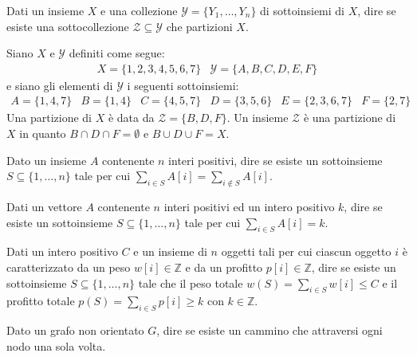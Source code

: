 \begin{problem}
    Dati un insieme $X$ e una collezione $\mathcal{Y}=\{Y_1,\dots,Y_n\}$ di
    sottoinsiemi di $X$, dire se esiste una sottocollezione $\mathcal{Z}\subseteq
    \mathcal{Y}$ che partizioni $X$.
\end{problem}
\begin{eg}
    Siano $X$ e $\mathcal{Y}$ definiti come segue:
    \[\begin{array}{lr}
        X=\{1,2,3,4,5,6,7\} & \mathcal{Y}=\{A,B,C,D,E,F\}
    \end{array}\]
    e siano gli elementi di $\mathcal{Y}$ i seguenti sottoinsiemi:
    \[\begin{array}{llllll}
        A=\{1,4,7\} & B=\{1,4\} & C=\{4,5,7\} & 
        D=\{3,5,6\} & E=\{2,3,6,7\} & F=\{2,7\}
    \end{array}\]
    Una partizione di $X$ è data da $\mathcal{Z}=\{B,D,F\}$. Un insieme
    $\mathcal{Z}$ è una partizione di $X$ in quanto $B\cap D\cap F=\emptyset$ e
    $B\cup D\cup F=X$.
\end{eg}

\begin{problem}
    Dato un insieme $A$ contenente $n$ interi positivi, dire se esiste un
    sottoinsieme $S\subseteq\{1,\dots,n\}$ tale per cui $\sum_{i\in S}A[i]=
    \sum_{i\notin S}A[i]$.
\end{problem}

\begin{problem}
    Dati un vettore $A$ contenente $n$ interi positivi ed un intero positivo $k$,
    dire se esiste un sottoinsieme $S\subseteq\{1,\dots,n\}$ tale per cui
    $\sum_{i\in S}A[i]=k$.
\end{problem}

\begin{problem}
    Dati un intero positivo $C$ e un insieme di $n$ oggetti tali per cui
    ciascun oggetto $i$ è caratterizzato da un peso $w[i]\in\mathbb{Z}$ e da un
    profitto $p[i]\in\mathbb{Z}$, dire se esiste un sottoinsieme $S\subseteq
    \{1,\dots,n\}$ tale che il peso totale $w(S)=\sum_{i\in S}w[i]\leq C$ e il
    profitto totale $p(S)=\sum_{i\in S}p[i]\geq k$ con $k\in\mathbb{Z}$.
\end{problem}

\begin{problem}
    Dato un grafo non orientato $G$, dire se esiste un cammino che attraversi
    ogni nodo una sola volta.
\end{problem}

